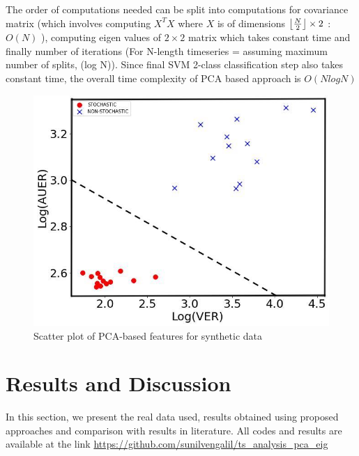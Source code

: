 \documentclass[journal]{IEEEtran}
\DeclarePairedDelimiter\floor{\lfloor}{\rfloor}
\begin{document}
	The order of computations needed can be split into computations for covariance matrix (which involves computing $X^TX$  where $X$ is of dimensions $ {\floor*{\frac{N}{2}}} \times 2$ : $O(N)$ ), computing eigen values of $2\times 2$ matrix which takes constant time and finally number of iterations  (For N-length timeseries = assuming maximum number of splits, (log N)). Since final SVM 2-class classification step also takes constant time, the overall time complexity of PCA based approach is $O(NlogN)$
	\begin{figure}[h]
		\centering
		\includegraphics[width=0.8\linewidth]{Scatterplot_poc_variance_area_threshold_7.jpg}
		\caption{Scatter plot of PCA-based features for synthetic data}
		\label{scatterplot}
	\end{figure}
	
	
	
	\section{Results and Discussion} \label{rnd}
	In this section, we present the real data used, results obtained using proposed approaches and comparison with results in literature. All codes and results are available at the link \href{https://github.com/sunilvengalil/ts_analysis_pca_eig}{https://github.com/sunilvengalil/ts\_analysis\_pca\_eig}
	
\end{document}
